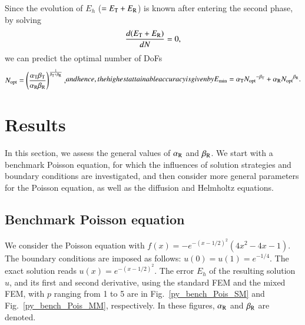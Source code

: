 \documentclass[review,3p]{elsarticle}
\begin{document}
Since the evolution of $E_{h}$ ($=E_{\rm T}+E_{\rm R}$) is known after entering the second phase, by solving
\begin{equation}
    \frac{d(E_{\rm T}+E_{\rm R})}{dN}=0,    \label{derivative_condition_N_opt}
\end{equation}
we can predict the optimal number of DoFs
\begin{subequations}
\begin{align}
 N_{\rm opt} = \left( \frac{\alpha_{\rm T} \beta_{\rm T}}{\alpha _{\rm R} \beta_{\rm R}} \right)^{\frac{1}{\beta_{\rm T} + \beta_{\rm R}}},
\end{align}
and hence, the highest attainable accuracy is given by
\begin{align}
 E_{\rm min} = \alpha_{\rm T} {N_{\rm opt}}^{- {\beta _{\rm T}}}+\alpha_{\rm R} {N_{\rm opt}}^{{\beta _{\rm R}}}.
\end{align}
\end{subequations}

\section{Results}  	\label{section_error_constants}

In this section, we assess the general values of $\alpha_{\rm R}$ and $\beta_{\rm R}$.
We start with a benchmark Poisson equation, for which the influences of solution strategies and boundary conditions are investigated, and then consider more general parameters for the Poisson equation, as well as the diffusion and Helmholtz equations.

\subsection{Benchmark Poisson equation}		\label{section_preliminary_results}

We consider the Poisson equation with $f(x)=-e^{- (x-1/2)^2} \left({4x^2 - 4x -1} \right)$. The boundary conditions are imposed as follows: $u(0)=u(1)= e^{-1/4}$. The exact solution reads $u(x)=e^{- (x-1/2)^2}$. The error $E_h$ of the resulting solution $u$, and its first and second derivative, using the standard FEM and the mixed FEM, with $p$ ranging from 1 to 5 are in Fig.~\ref{py_bench_Pois_SM} and Fig.~\ref{py_bench_Pois_MM}, respectively. In these figures, $\alpha_{\rm R}$ and $\beta_{\rm R}$ are denoted.
\end{document}
